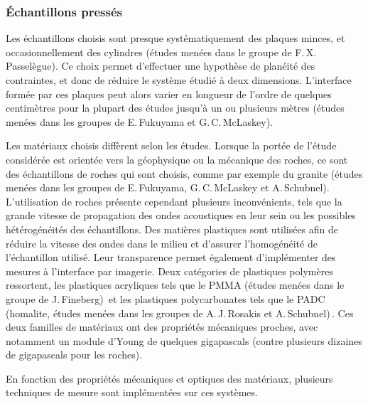 \subsubsection{Échantillons pressés}

Les échantillons choisis sont presque systématiquement des plaques minces, et occasionnellement des cylindres (études menées dans le groupe de F.\,X.\,Passelègue). Ce choix permet d'effectuer une hypothèse de planéité des contraintes, et donc de réduire le système étudié à deux dimensions. L'interface formée par ces plaques peut alors varier en longueur de l'ordre de quelques centimètres pour la plupart des études jusqu'à un ou plusieurs mètres (études menées dans les groupes de E.\,Fukuyama et G.\,C.\,McLaskey).

Les matériaux choisis diffèrent selon les études. Lorsque la portée de l'étude considérée est orientée vers la géophysique ou la mécanique des roches, ce sont des échantillons de roches qui sont choisis, comme par exemple du granite (études menées dans les groupes de E.\,Fukuyama, G.\,C.\,McLaskey et A.\,Schubnel).
L'utilisation de roches présente cependant plusieurs inconvénients, tels que la grande vitesse de propagation des ondes acoustiques en leur sein ou les possibles hétérogénéités des échantillons.
Des matières plastiques sont utilisées afin de réduire la vitesse des ondes dans le milieu et d'assurer l'homogénéité de l'échantillon utilisé. Leur transparence permet également d'implémenter des mesures à l'interface par imagerie.
Deux catégories de plastiques polymères ressortent, les plastiques acryliques tels que le PMMA (études menées dans le groupe de J.\,Fineberg)\,\cite{rubinstein_detachment_2004,rubinstein_crack-like_2006,rubinstein_dynamics_2007, svetlizky_classical_2014,svetlizky_brittle_2017, bayart_slippery_2016, svetlizky_brittle_2019} et les plastiques polycarbonates tels que le PADC (homalite, études menées dans les groupes de A.\,J.\,Rosakis et A.\,Schubnel)\,\cite{rosakis_intersonic_2000, xia_laboratory_2004, latour_characterization_2013, nielsen_experimental_2010, schubnel_photo-acoustic_2011, rubino_understanding_2017}. Ces deux familles de matériaux ont des propriétés mécaniques proches, avec notamment un module d'Young de quelques gigapascals (contre plusieurs dizaines de gigapascals pour les roches).


En fonction des propriétés mécaniques et optiques des matériaux, plusieurs techniques de mesure sont implémentées sur ces systèmes.

